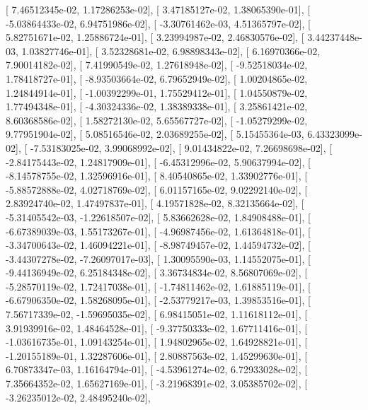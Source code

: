 \documentclass{article}
\begin{document}
       [  7.46512345e-02,   1.17286253e-02],
       [  3.47185127e-02,   1.38065390e-01],
       [ -5.03864433e-02,   6.94751986e-02],
       [ -3.30761462e-03,   4.51365797e-02],
       [  5.82751671e-02,   1.25886724e-01],
       [  3.23994987e-02,   2.46830576e-02],
       [  3.44237448e-03,   1.03827746e-01],
       [  3.52328681e-02,   6.98898343e-02],
       [  6.16970366e-02,   7.90014182e-02],
       [  7.41990549e-02,   1.27618948e-02],
       [ -9.52518034e-02,   1.78418727e-01],
       [ -8.93503664e-02,   6.79652949e-02],
       [  1.00204865e-02,   1.24844914e-01],
       [ -1.00392299e-01,   1.75529412e-01],
       [  1.04550879e-02,   1.77494348e-01],
       [ -4.30324336e-02,   1.38389338e-01],
       [  3.25861421e-02,   8.60368586e-02],
       [  1.58272130e-02,   5.65567727e-02],
       [ -1.05279299e-02,   9.77951904e-02],
       [  5.08516546e-02,   2.03689255e-02],
       [  5.15455364e-03,   6.43323099e-02],
       [ -7.53183025e-02,   3.99068992e-02],
       [  9.01434822e-02,   7.26698698e-02],
       [ -2.84175443e-02,   1.24817909e-01],
       [ -6.45312996e-02,   5.90637994e-02],
       [ -8.14578755e-02,   1.32596916e-01],
       [  8.40540865e-02,   1.33902776e-01],
       [ -5.88572888e-02,   4.02718769e-02],
       [  6.01157165e-02,   9.02292140e-02],
       [  2.83924740e-02,   1.47497837e-01],
       [  4.19571828e-02,   8.32135664e-02],
       [ -5.31405542e-03,  -1.22618507e-02],
       [  5.83662628e-02,   1.84908488e-01],
       [ -6.67389039e-03,   1.55173267e-01],
       [ -4.96987456e-02,   1.61364818e-01],
       [ -3.34700643e-02,   1.46094221e-01],
       [ -8.98749457e-02,   1.44594732e-02],
       [ -3.44307278e-02,  -7.26097017e-03],
       [  1.30095590e-03,   1.14552075e-01],
       [ -9.44136949e-02,   6.25184348e-02],
       [  3.36734834e-02,   8.56807069e-02],
       [ -5.28570119e-02,   1.72417038e-01],
       [ -1.74811462e-02,   1.61885119e-01],
       [ -6.67906350e-02,   1.58268095e-01],
       [ -2.53779217e-03,   1.39853516e-01],
       [  7.56717339e-02,  -1.59695035e-02],
       [  6.98415051e-02,   1.11618112e-01],
       [  3.91939916e-02,   1.48464528e-01],
       [ -9.37750333e-02,   1.67711416e-01],
       [ -1.03616735e-01,   1.09143254e-01],
       [  1.94802965e-02,   1.64928821e-01],
       [ -1.20155189e-01,   1.32287606e-01],
       [  2.80887563e-02,   1.45299630e-01],
       [  6.70873347e-03,   1.16164794e-01],
       [ -4.53961274e-02,   6.72933028e-02],
       [  7.35664352e-02,   1.65627169e-01],
       [ -3.21968391e-02,   3.05385702e-02],
       [ -3.26235012e-02,   2.48495240e-02],
\end{document}
